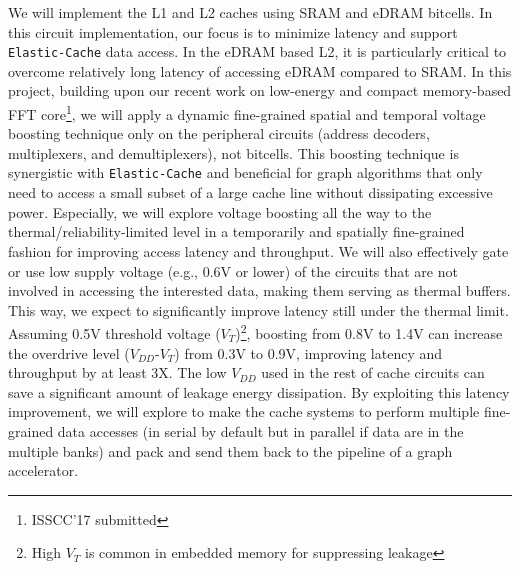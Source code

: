 We will implement the L1 and L2 caches using SRAM and eDRAM bitcells. In this circuit implementation, our focus is to minimize latency and support \texttt{Elastic-Cache} data access. In the eDRAM based L2, it is particularly critical to overcome relatively long latency of accessing eDRAM compared to SRAM. In this project, building upon our recent work on low-energy and compact memory-based FFT core\footnote{ISSCC'17 submitted}, we will apply a dynamic fine-grained spatial and temporal voltage boosting technique only on the peripheral circuits (address decoders, multiplexers, and demultiplexers), not bitcells. This boosting technique is synergistic with \texttt{Elastic-Cache} and beneficial for graph algorithms that only need to access a small subset of a large cache line without dissipating excessive power. Especially, we will explore voltage boosting all the way to the thermal/reliability-limited level in a temporarily and spatially fine-grained fashion for improving access latency and throughput. We will also effectively gate or use low supply voltage (e.g., 0.6V or lower) of the circuits that are not involved in accessing the interested data, making them serving as thermal buffers. This way, we expect to significantly improve latency still under the thermal limit. Assuming 0.5V threshold voltage ($V_T$)\footnote{High $V_T$ is common in embedded memory for suppressing leakage}, boosting from 0.8V to 1.4V can increase the overdrive level ($V_{DD}$-$V_T$) from 0.3V to 0.9V, improving latency and throughput by at least 3X. The low $V_{DD}$ used in the rest of cache circuits can save a significant amount of leakage energy dissipation. By exploiting this latency improvement, we will explore to make the cache systems to perform multiple fine-grained data accesses (in serial by default but in parallel if data are in the multiple banks) and pack and send them back to the pipeline of a graph accelerator. 

